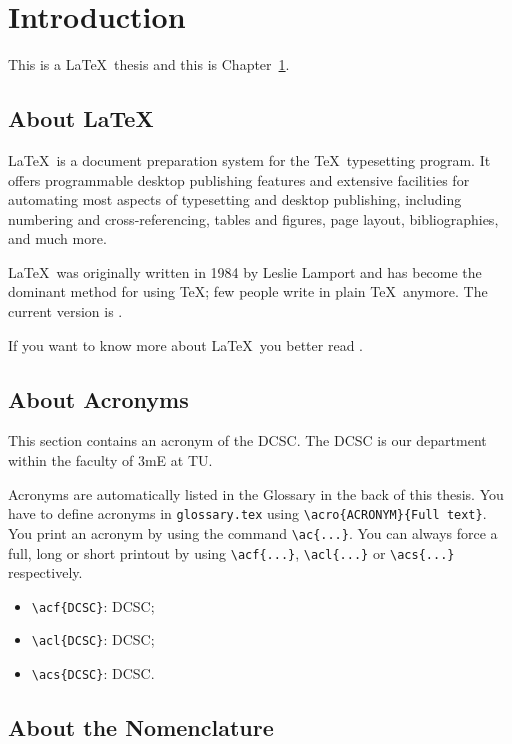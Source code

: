 %
\chapter{Introduction} \label{chap::intro}

This is a \LaTeX\ thesis and this is Chapter\ \ref{chap::intro}. 

\section{About \texorpdfstring{\LaTeX}{LaTeX}}

\LaTeX\ is a document preparation system for the \TeX\ typesetting program. It offers programmable desktop publishing features and extensive facilities for automating most aspects of typesetting and desktop publishing, including numbering and cross-referencing, tables and figures, page layout, bibliographies, and much more. 

\LaTeX\ was originally written in 1984 by Leslie Lamport and has become the dominant method for using \TeX; few people write in plain \TeX\ anymore. The current version is \LaTeXe.

If you want to know more about \LaTeX\ you better read \cite{texbook}. 

 
\section{About Acronyms}

This section contains an acronym of the \ac{DCSC}. The \ac{DCSC} is our department within the faculty of \ac{3mE} at \ac{TU}. 

Acronyms are automatically listed in the Glossary in the back of this thesis. You have to define acronyms in \texttt{glossary.tex} using \verb"\acro{ACRONYM}{Full text}". You print an acronym by using the command \verb"\ac{...}". You can always force a full, long or short printout by using \verb"\acf{...}", \verb"\acl{...}" or \verb"\acs{...}" respectively. 

\begin{itemize}
	\item \verb"\acf{DCSC}": \acf{DCSC};
	\item \verb"\acl{DCSC}": \acl{DCSC};
	\item \verb"\acs{DCSC}": \acs{DCSC}.
\end{itemize}

\section{About the Nomenclature}

